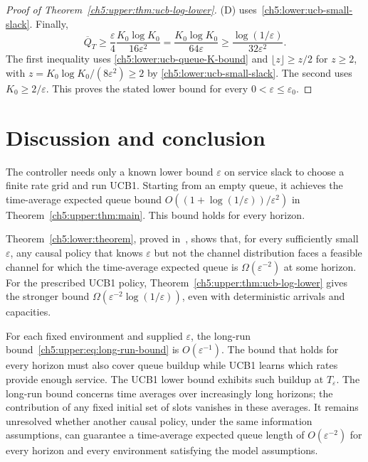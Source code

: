 \begin{proof}[Proof of Theorem~\ref{ch5:upper:thm:ucb-log-lower}]
(D) uses~\eqref{ch5:lower:ucb-small-slack}.
Finally,
\begin{equation}
\overline Q_T
 \ge\frac{\varepsilon}{4}
       \frac{K_0\log K_0}{16\varepsilon^2}
 =\frac{K_0\log K_0}{64\varepsilon}
\ge\frac{\log(1/\varepsilon)}{32\varepsilon^2}.
\label{ch5:lower:ucb-final-bound}
\end{equation}
The first inequality uses \eqref{ch5:lower:ucb-queue-K-bound} and
$\lfloor z\rfloor\ge z/2$ for $z\ge2$, with
$z=K_0\log K_0/(8\varepsilon^2)\ge2$ by
\eqref{ch5:lower:ucb-small-slack}. The second uses
$K_0\ge2/\varepsilon$.
This proves the stated lower bound for every
$0<\varepsilon\le\varepsilon_0$.
\end{proof}

\section{Discussion and conclusion}
\label{ch5:sec:conclusion}

The controller needs only a known lower bound $\varepsilon$ on service slack to choose
a finite rate grid and run UCB1. Starting from an empty queue, it
achieves the time-average expected queue bound
$O((1+\log(1/\varepsilon))/\varepsilon^2)$ in
Theorem~\ref{ch5:upper:thm:main}. This bound holds for every horizon.

Theorem~\ref{ch5:lower:theorem}, proved in~\cite{wijewardena2026banditbased},
shows that, for every sufficiently small $\varepsilon$, any causal policy that knows
$\varepsilon$ but not the channel distribution faces a feasible
channel for which the time-average expected queue is
$\Omega(\varepsilon^{-2})$ at some horizon.
For the prescribed UCB1 policy,
Theorem~\ref{ch5:upper:thm:ucb-log-lower} gives the stronger bound
$\Omega(\varepsilon^{-2}\log(1/\varepsilon))$, even with deterministic
arrivals and capacities.

For each fixed environment and supplied $\varepsilon$, the long-run
bound~\eqref{ch5:upper:eq:long-run-bound} is $O(\varepsilon^{-1})$.
The bound that holds for every horizon must also cover queue buildup while
UCB1 learns which rates provide enough service. The UCB1 lower bound
exhibits such buildup at $T_\varepsilon$. The long-run bound concerns
time averages over increasingly long horizons; the contribution of any
fixed initial set of slots vanishes in these averages. It remains unresolved
whether another causal policy, under the same information assumptions, can
guarantee a time-average expected queue length of $O(\varepsilon^{-2})$ for
every horizon and every environment satisfying the model assumptions.

